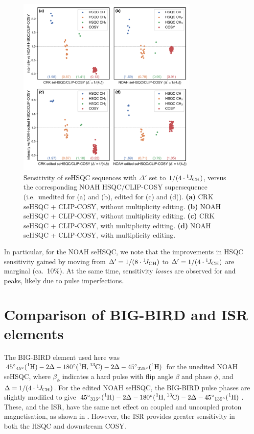 \begin{figure}
    \centering
    \includegraphics[width=0.8\textwidth]{./figures/combined_1_4j.png}
    \caption{
        Sensitivity of seHSQC sequences with $\Delta'$ set to $1/(4\cdot\onejch)$, versus the corresponding NOAH HSQC/CLIP-COSY supersequence (i.e.\ unedited for (a) and (b), edited for (c) and (d)).
        \textbf{(a)} CRK seHSQC + CLIP-COSY, without multiplicity editing.
        \textbf{(b)} NOAH seHSQC + CLIP-COSY, without multiplicity editing.
        \textbf{(c)} CRK seHSQC + CLIP-COSY, with multiplicity editing.
        \textbf{(d)} NOAH seHSQC + CLIP-COSY, with multiplicity editing.
        \andro{}
    }
    \label{fig:combined_1_4j}
\end{figure}

In particular, for the NOAH seHSQC, we note that the improvements in HSQC  sensitivity gained by moving from $\Delta' = 1/(8\cdot\onejch)$ to $\Delta' = 1/(4\cdot\onejch)$ are marginal (ca.\ 10\%).
At the same time, sensitivity \textit{losses} are observed for  and  peaks, likely due to pulse imperfections.

\section{Comparison of BIG-BIRD and ISR elements}

The BIG-BIRD element used here was ${45^\circ}_{45^\circ}(\proton{}) - 2\Delta - 180^\circ(\proton{},\carbon{}) - 2\Delta - {45^\circ}_{225^\circ}(\proton{})$ for the unedited NOAH seHSQC, where $\beta_\phi$ indicates a hard pulse with flip angle $\beta$ and phase $\phi$, and $\Delta = 1/(4\cdot\onejch)$.
For the edited NOAH seHSQC, the BIG-BIRD pulse phases are slightly modified to give ${45^\circ}_{315^\circ}(\proton{}) - 2\Delta - 180^\circ(\proton{},\carbon{}) - 2\Delta - {45^\circ}_{135^\circ}(\proton{})$.
These, and the ISR, have the same net effect on coupled and uncoupled proton magnetisation, as shown in .
However, the ISR provides greater sensitivity in both the HSQC and downstream COSY.

